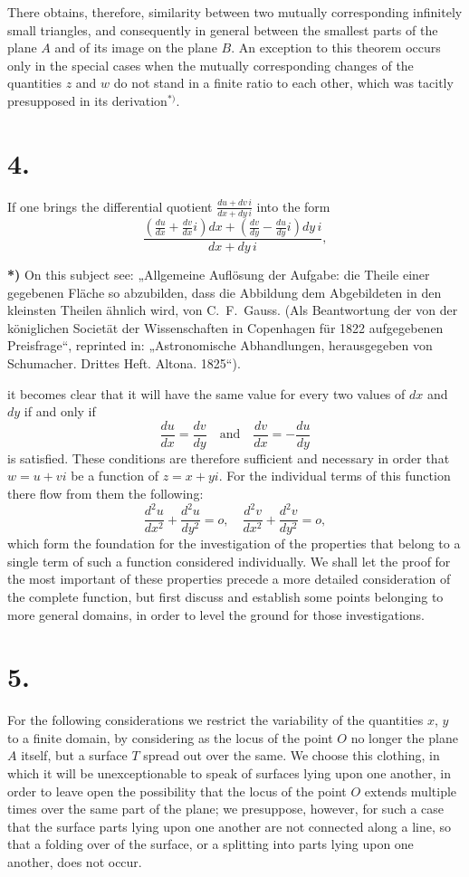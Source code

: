\documentclass{article}
\begin{document}
There obtains, therefore, similarity between two mutually corresponding infinitely small triangles, and consequently in general between the smallest parts of the plane $A$ and of its image on the plane $B$. An exception to this theorem occurs only in the special cases when the mutually corresponding changes of the quantities $z$ and $w$ do not stand in a finite ratio to each other, which was tacitly presupposed in its derivation${}^{*)}$.

\section*{4.}

If one brings the differential quotient $\frac{du + dv\,i}{dx + dy\,i}$ into the form
\[
\frac{\left(\frac{du}{dx} + \frac{dv}{dx}i\right)dx + \left(\frac{dv}{dy} - \frac{du}{dy}i\right)dy\,i}{dx + dy\,i},
\]

\textbf{*)} On this subject see:
„Allgemeine Auflösung der Aufgabe: die Theile einer gegebenen Fläche so abzubilden, dass die Abbildung dem Abgebildeten in den kleinsten Theilen ähnlich wird, von C.~F.~Gauss. (Als Beantwortung der von der königlichen Societät der Wissenschaften in Copenhagen für 1822 aufgegebenen Preisfrage“, reprinted in: „Astronomische Abhandlungen, herausgegeben von Schumacher. Drittes Heft. Altona. 1825“).

it becomes clear that it will have the same value for every two values of $dx$ and $dy$ if and only if
\[
\frac{du}{dx} = \frac{dv}{dy} \quad \text{and} \quad \frac{dv}{dx} = -\frac{du}{dy}
\]
is satisfied. These conditions are therefore sufficient and necessary in order that $w = u + vi$ be a function of $z = x + yi$. For the individual terms of this function there flow from them the following:
\[
\frac{d^2u}{dx^2} + \frac{d^2u}{dy^2} = o, \quad \frac{d^2v}{dx^2} + \frac{d^2v}{dy^2} = o,
\]
which form the foundation for the investigation of the properties that belong to a single term of such a function considered individually. We shall let the proof for the most important of these properties precede a more detailed consideration of the complete function, but first discuss and establish some points belonging to more general domains, in order to level the ground for those investigations.

\section*{5.}

For the following considerations we restrict the variability of the quantities $x$, $y$ to a finite domain, by considering as the locus of the point $O$ no longer the plane $A$ itself, but a surface $T$ spread out over the same. We choose this clothing, in which it will be unexceptionable to speak of surfaces lying upon one another, in order to leave open the possibility that the locus of the point $O$ extends multiple times over the same part of the plane; we presuppose, however, for such a case that the surface parts lying upon one another are not connected along a line, so that a folding over of the surface, or a splitting into parts lying upon one another, does not occur.
\end{document}
